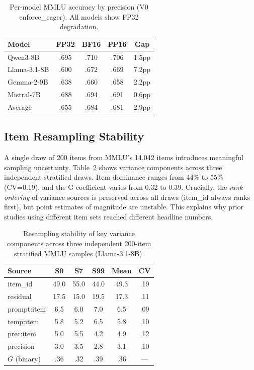\documentclass[11pt,twocolumn]{article}
\begin{document}
\begin{table}[t]
\centering
\caption{Per-model MMLU accuracy by precision (V0 enforce\_eager). All models show FP32 degradation.}
\label{tab:precision_accuracy}
\small
\begin{tabular}{@{}lcccc@{}}
\toprule
Model & FP32 & BF16 & FP16 & Gap \\
\midrule
Qwen3-8B & .695 & .710 & .706 & 1.5pp \\
Llama-3.1-8B & .600 & .672 & .669 & 7.2pp \\
Gemma-2-9B & .638 & .660 & .658 & 2.2pp \\
Mistral-7B & .688 & .694 & .691 & 0.6pp \\
\midrule
Average & .655 & .684 & .681 & 2.9pp \\
\bottomrule
\end{tabular}
\end{table}

\subsection{Item Resampling Stability}
\label{sec:resampling}

A single draw of 200 items from MMLU's 14,042 items introduces meaningful sampling uncertainty. Table~\ref{tab:resampling} shows variance components across three independent stratified draws. Item dominance ranges from 44\% to 55\% (CV=0.19), and the G-coefficient varies from 0.32 to 0.39. Crucially, the \emph{rank ordering} of variance sources is preserved across all draws (item\_id always ranks first), but point estimates of magnitude are unstable. This explains why prior studies using different item sets reached different headline numbers.

\begin{table}[t]
\centering
\caption{Resampling stability of key variance components across three independent 200-item stratified MMLU samples (Llama-3.1-8B).}
\label{tab:resampling}
\small
\begin{tabular}{@{}lccccc@{}}
\toprule
Source & S0 & S7 & S99 & Mean & CV \\
\midrule
item\_id & 49.0 & 55.0 & 44.0 & 49.3 & .19 \\
residual & 17.5 & 15.0 & 19.5 & 17.3 & .11 \\
prompt:item & 6.5 & 6.0 & 7.0 & 6.5 & .09 \\
temp:item & 5.8 & 5.2 & 6.5 & 5.8 & .10 \\
prec:item & 5.0 & 5.5 & 4.2 & 4.9 & .12 \\
precision & 3.0 & 3.5 & 2.8 & 3.1 & .10 \\
\midrule
$G$ (binary) & .36 & .32 & .39 & .36 & --- \\
\bottomrule
\end{tabular}
\end{table}
\end{document}

